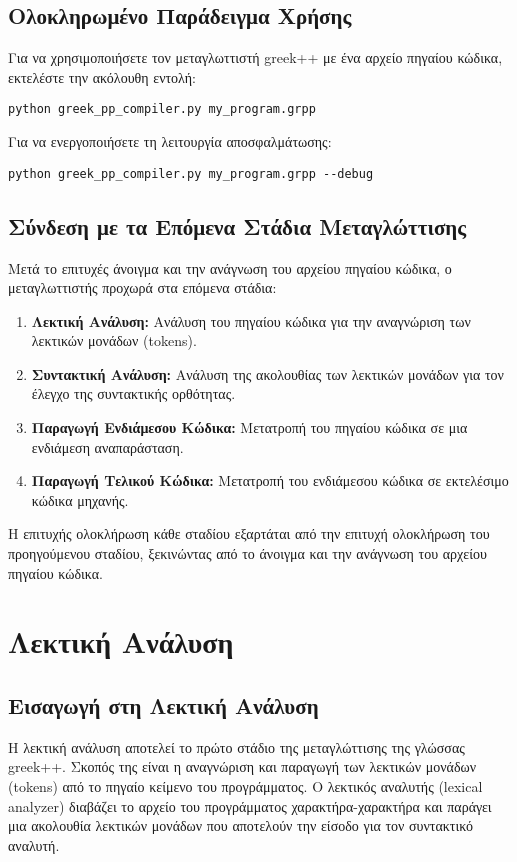 \documentclass[12pt,a4paper]{article}
\begin{document}
\subsection{Ολοκληρωμένο Παράδειγμα Χρήσης}

Για να χρησιμοποιήσετε τον μεταγλωττιστή greek++ με ένα αρχείο πηγαίου κώδικα, εκτελέστε την ακόλουθη εντολή:

\begin{verbatim}
python greek_pp_compiler.py my_program.grpp
\end{verbatim}

Για να ενεργοποιήσετε τη λειτουργία αποσφαλμάτωσης:

\begin{verbatim}
python greek_pp_compiler.py my_program.grpp --debug
\end{verbatim}

\subsection{Σύνδεση με τα Επόμενα Στάδια Μεταγλώττισης}

Μετά το επιτυχές άνοιγμα και την ανάγνωση του αρχείου πηγαίου κώδικα, ο μεταγλωττιστής προχωρά στα επόμενα στάδια:

\begin{enumerate}
    \item \textbf{Λεκτική Ανάλυση:} Ανάλυση του πηγαίου κώδικα για την αναγνώριση των λεκτικών μονάδων (tokens).
    \item \textbf{Συντακτική Ανάλυση:} Ανάλυση της ακολουθίας των λεκτικών μονάδων για τον έλεγχο της συντακτικής ορθότητας.
    \item \textbf{Παραγωγή Ενδιάμεσου Κώδικα:} Μετατροπή του πηγαίου κώδικα σε μια ενδιάμεση αναπαράσταση.
    \item \textbf{Παραγωγή Τελικού Κώδικα:} Μετατροπή του ενδιάμεσου κώδικα σε εκτελέσιμο κώδικα μηχανής.
\end{enumerate}

Η επιτυχής ολοκλήρωση κάθε σταδίου εξαρτάται από την επιτυχή ολοκλήρωση του προηγούμενου σταδίου, ξεκινώντας από το άνοιγμα και την ανάγνωση του αρχείου πηγαίου κώδικα.

    \section{Λεκτική Ανάλυση}

        \subsection{Εισαγωγή στη Λεκτική Ανάλυση}
            Η λεκτική ανάλυση αποτελεί το πρώτο στάδιο της μεταγλώττισης της γλώσσας greek++. Σκοπός της είναι η αναγνώριση και παραγωγή των λεκτικών μονάδων (tokens) από το πηγαίο κείμενο του προγράμματος. Ο λεκτικός αναλυτής (lexical analyzer) διαβάζει το αρχείο του προγράμματος χαρακτήρα-χαρακτήρα και παράγει μια ακολουθία λεκτικών μονάδων που αποτελούν την είσοδο για τον συντακτικό αναλυτή.
\end{document}

